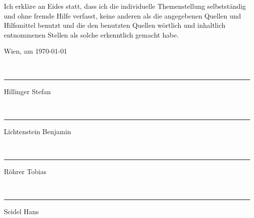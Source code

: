 
Ich erkläre an Eides statt, dass ich die individuelle Themenstellung
selbstständig und ohne fremde Hilfe verfasst, keine anderen als die
angegebenen Quellen und Hilfsmittel benutzt und die den benutzten
Quellen wörtlich und inhaltlich entnommenen Stellen als solche erkenntlich
gemacht habe.

\begin{flushleft}
\bigskip{}
Wien, am \today \\
\newcommand{\namesigdate}[2][8cm]{
\vspace{2cm}~\newline
\parbox{#1}{\hrule\centering #2\Large\strut}
\hfill
}
\namesigdate{Hillinger Stefan}
\namesigdate{Lichtenstein Benjamin}
\namesigdate{Röhrer Tobias}
\namesigdate{Seidel Hans}
\par\end{flushleft}

